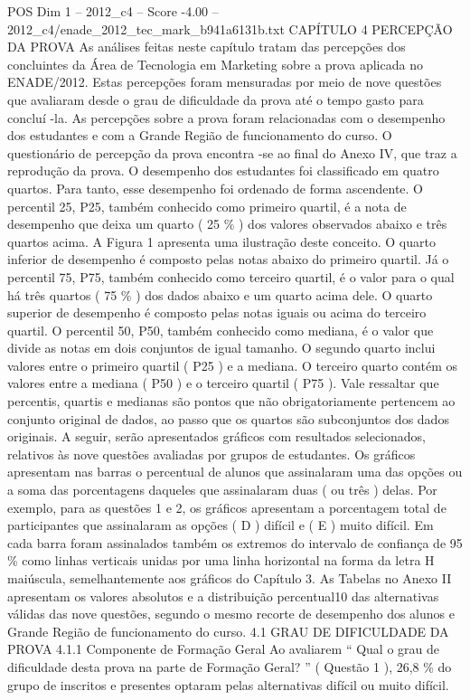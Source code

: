 \begin{textsample}{POS Dim 1 – 2012\_c4 – Score -4.00 – 2012\_c4/enade\_2012\_tec\_mark\_b941a6131b.txt}  \label{ex:f1_pos_366}
CAPÍTULO 4 PERCEPÇÃO DA PROVA As análises feitas neste capítulo tratam das percepções dos concluintes da Área de Tecnologia em Marketing sobre a prova aplicada no ENADE/2012.
Estas percepções foram mensuradas por meio de nove questões que avaliaram desde o grau de dificuldade da prova até o tempo gasto para concluí -la.
As percepções sobre a prova foram relacionadas com o desempenho dos estudantes e com a Grande Região de funcionamento do curso.
O questionário de percepção da prova encontra -se ao final do Anexo IV, que traz a reprodução da prova.
O desempenho dos estudantes foi classificado em quatro quartos.
Para tanto, esse desempenho foi ordenado de forma ascendente.
O percentil 25, P25, também conhecido como primeiro quartil, é a nota de desempenho que deixa um quarto ( 25 \% ) dos valores observados abaixo e três quartos acima.
A Figura 1 apresenta uma ilustração deste conceito.
O quarto inferior de desempenho é composto pelas notas abaixo do primeiro quartil.
Já o percentil 75, P75, também conhecido como terceiro quartil, é o valor para o qual há três quartos ( 75 \% ) dos dados abaixo e um quarto acima dele.
O quarto superior de desempenho é composto pelas notas iguais ou acima do terceiro quartil.
O percentil 50, P50, também conhecido como mediana, é o valor que divide as notas em dois conjuntos de igual tamanho.
O segundo quarto inclui valores entre o primeiro quartil ( P25 ) e a mediana.
O terceiro quarto contém os valores entre a mediana ( P50 ) e o terceiro quartil ( P75 ).
Vale ressaltar que percentis, quartis e medianas são pontos que não obrigatoriamente pertencem ao conjunto original de dados, ao passo que os quartos são subconjuntos dos dados originais.
A seguir, serão apresentados gráficos com resultados selecionados, relativos às nove questões avaliadas por grupos de estudantes.
Os gráficos apresentam nas barras o percentual de alunos que assinalaram uma das opções ou a soma das porcentagens daqueles que assinalaram duas ( ou três ) delas.
Por exemplo, para as questões 1 e 2, os gráficos apresentam a porcentagem total de participantes que assinalaram as opções ( D ) difícil e ( E ) muito difícil.
Em cada barra foram assinalados também os extremos do intervalo de confiança de 95 \% como linhas verticais unidas por uma linha horizontal na forma da letra H maiúscula, semelhantemente aos gráficos do Capítulo 3.
As Tabelas no Anexo II apresentam os valores absolutos e a distribuição percentual10 das alternativas válidas das nove questões, segundo o mesmo recorte de desempenho dos alunos e Grande Região de funcionamento do curso. 4.1 GRAU DE DIFICULDADE DA PROVA 4.1.1 Componente de Formação Geral Ao avaliarem “ Qual o grau de dificuldade desta prova na parte de Formação Geral? ” ( Questão 1 ), 26,8 \% do grupo de inscritos e presentes optaram pelas alternativas difícil ou muito difícil.

\end{textsample}
